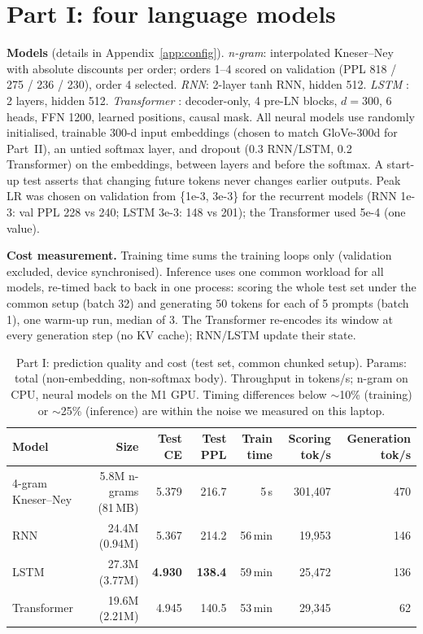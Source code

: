 \documentclass[10pt,a4paper]{article}
\begin{document}
\section{Part I: four language models}
\textbf{Models} (details in Appendix~\ref{app:config}). \emph{n-gram}: interpolated Kneser--Ney
\citep{kneser1995,chen1999} with absolute discounts per order; orders 1--4 scored on validation (PPL 818 / 275 /
236 / 230), order 4 selected. \emph{RNN}: 2-layer tanh RNN, hidden 512. \emph{LSTM} \citep{hochreiter1997}: 2
layers, hidden 512. \emph{Transformer} \citep{vaswani2017}: decoder-only, 4 pre-LN blocks, $d{=}300$, 6 heads,
FFN 1200, learned positions, causal mask. All neural models use randomly initialised, trainable 300-d input
embeddings (chosen to match GloVe-300d for Part~II), an untied softmax layer, and dropout (0.3 RNN/LSTM, 0.2
Transformer) on the embeddings, between layers and before the softmax. A start-up test asserts that changing
future tokens never changes earlier outputs. Peak LR was chosen on validation from \{1e-3, 3e-3\} for the
recurrent models (RNN 1e-3: val PPL 228 vs 240; LSTM 3e-3: 148 vs 201); the Transformer used 5e-4 (one value).

\textbf{Cost measurement.} Training time sums the training loops only (validation excluded, device
synchronised). Inference uses one common workload for all models, re-timed back to back in one process:
scoring the whole test set under the common setup (batch 32) and generating 50 tokens for each of 5 prompts
(batch 1), one warm-up run, median of 3. The Transformer re-encodes its window at every generation step (no
KV cache); RNN/LSTM update their state.

\begin{table}[t]
\centering\small
\caption{Part I: prediction quality and cost (test set, common chunked setup). Params: total (non-embedding,
non-softmax body). Throughput in tokens/s; n-gram on CPU, neural models on the M1 GPU. Timing differences
below $\sim$10\% (training) or $\sim$25\% (inference) are within the noise we measured on this laptop.}
\label{tab:part1}
\begin{tabular}{lrrrrrr}
\toprule
Model & Size & Test CE & \textbf{Test PPL} & Train time & Scoring tok/s & Generation tok/s\\
\midrule
4-gram Kneser--Ney & 5.8M n-grams (81\,MB) & 5.379 & 216.7 & 5\,s & 301{,}407 & 470\\
RNN & 24.4M (0.94M) & 5.367 & 214.2 & 56\,min & 19{,}953 & 146\\
LSTM & 27.3M (3.77M) & \textbf{4.930} & \textbf{138.4} & 59\,min & 25{,}472 & 136\\
Transformer & 19.6M (2.21M) & 4.945 & 140.5 & 53\,min & 29{,}345 & 62\\
\bottomrule
\end{tabular}
\end{table}
\end{document}
